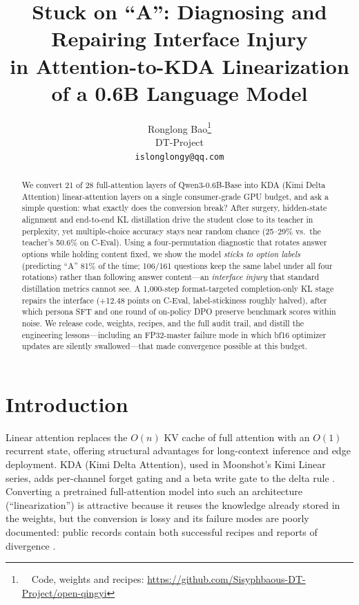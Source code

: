 \documentclass[11pt]{article}
\title{Stuck on ``A'': Diagnosing and Repairing Interface Injury\\
in Attention-to-KDA Linearization of a 0.6B Language Model}
\author{Ronglong Bao\thanks{~~Code, weights and recipes: \url{https://github.com/Sisyphbaous-DT-Project/open-qingyi}} \\
  DT-Project \\
  \texttt{islonglongy@qq.com}}
\begin{document}
\maketitle

\begin{abstract}
We convert 21 of 28 full-attention layers of Qwen3-0.6B-Base into KDA
(Kimi Delta Attention) linear-attention layers on a single consumer-grade
GPU budget, and ask a simple question: what exactly does the conversion
break? After surgery, hidden-state alignment and end-to-end KL
distillation drive the student close to its teacher in perplexity, yet
multiple-choice accuracy stays near random chance (25--29\% vs.\ the
teacher's 50.6\% on C-Eval). Using a four-permutation diagnostic that
rotates answer options while holding content fixed, we show the model
\emph{sticks to option labels} (predicting ``A'' 81\% of the time;
106/161 questions keep the same label under all four rotations) rather
than following answer content---an \emph{interface injury} that standard
distillation metrics cannot see. A 1,000-step format-targeted
completion-only KL stage repairs the interface (+12.48 points on C-Eval,
label-stickiness roughly halved), after which persona SFT and one round
of on-policy DPO preserve benchmark scores within noise. We release
code, weights, recipes, and the full audit trail, and distill the
engineering lessons---including an FP32-master failure mode in which
bf16 optimizer updates are silently swallowed---that made convergence
possible at this budget.
\end{abstract}

\section{Introduction}

Linear attention replaces the $O(n)$ KV cache of full attention with an
$O(1)$ recurrent state, offering structural advantages for long-context
inference and edge deployment. KDA (Kimi Delta Attention), used in
Moonshot's Kimi Linear series, adds per-channel forget gating and a beta
write gate to the delta rule \citep{yang2024gated,kimilinear}. Converting
a pretrained full-attention model into such an architecture
(``linearization'') is attractive because it reuses the knowledge already
stored in the weights, but the conversion is lossy and its failure modes
are poorly documented: public records contain both successful recipes
\citep{kostelec2026gendistill} and reports of divergence
\citep{chen2026halo}.
\end{document}
